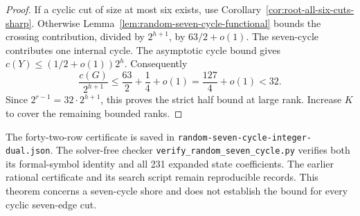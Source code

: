 \begin{proof}
If a cyclic cut of size at most six exists, use Corollary~\ref{cor:root-all-six-cuts-sharp}.
Otherwise Lemma~\ref{lem:random-seven-cycle-functional} bounds the crossing contribution, divided by $2^{h+1}$, by $63/2+o(1)$.
The seven-cycle contributes one internal cycle.
The asymptotic cycle bound gives $c(Y)\le(1/2+o(1))2^h$.
Consequently
\[
 \frac{c(G)}{2^{h+1}}
 \le\frac{63}{2}+\frac14+o(1)
 =\frac{127}{4}+o(1)<32.
\]
Since $2^{r-1}=32\cdot2^{h+1}$, this proves the strict half bound at large rank.
Increase $K$ to cover the remaining bounded ranks.
\end{proof}

The forty-two-row certificate is saved in \texttt{random-seven-cycle-integer-dual.json}.
The solver-free checker \texttt{verify\_random\_seven\_cycle.py} verifies both its formal-symbol identity and all 231 expanded state coefficients.
The earlier rational certificate and its search script remain reproducible records.
This theorem concerns a seven-cycle shore and does not establish the bound for every cyclic seven-edge cut.
